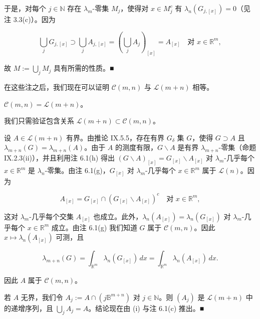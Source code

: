 \begin{remark}
\begin{items}
于是，对每个 $ j \in \mathbb{N} $ 存在 $ \lambda_m $-零集 $ M_j $，使得对 $ x \in M_j^{c} $ 有 $ \lambda_n(G_{j,[x]}) = 0 $（见注 3.3(c)）。因为

\[
\bigcup_j G_{j,[x]} \supset \bigcup_j A_{j,[x]} = \left( \bigcup_j A_j \right)_{[x]} = A_{[x]} \quad \text{对 } x \in \mathbb{R}^m ,
\]

故 $ M := \bigcup_j M_j $ 具有所需的性质。\nobreak\hspace{0.35em}■

\end{items}

在这些注之后，我们现在可以证明 $ \mathcal{C}(m, n) $ 与 $ \mathcal{L}(m+n) $ 相等。

\end{remark}

\begin{proposition}

$ \mathcal{C}(m, n) = \mathcal{L}(m+n) $。

\proofhead
我们只需验证包含关系 $ \mathcal{L}(m+n) \subset \mathcal{C}(m, n) $。

\begin{subitems}
\item

设 $ A \in \mathcal{L}(m+n) $ 有界。由推论 IX.5.5，存在有界 $ G_\delta $ 集 $ G $，使得 $ G \supset A $ 且 $ \lambda_{m+n}(G) = \lambda_{m+n}(A) $。由于 $ A $ 的测度有限，$ G \backslash A $ 是有界 $ \lambda_{m+n} $-零集（命题 IX.2.3(ii)），并且利用注 6.1(h) 得出 $ (G \backslash A)_{[x]} = G_{[x]} \backslash A_{[x]} $ 对 $ \lambda_m $-几乎每个 $ x \in \mathbb{R}^m $ 是 $ \lambda_n $-零集。由注 6.1(g)，$ G_{[x]} $ 对 $ \lambda_m $-几乎每个 $ x \in \mathbb{R}^m $ 属于 $ \mathcal{L}(n) $。因为

\[
A_{[x]} = G_{[x]} \cap (G_{[x]} \backslash A_{[x]})^{c} \quad \text{对 } x \in \mathbb{R}^m ,
\]

这对 $ \lambda_m $-几乎每个交集 $ A_{[x]} $ 也成立。此外，$ \lambda_n(A_{[x]}) = \lambda_n(G_{[x]}) $ 对 $ \lambda_m $-几乎每个 $ x \in \mathbb{R}^m $ 成立。由注 6.1(g) 我们知道 $ G $ 属于 $ \mathcal{C}(m, n) $。因此 $ x \mapsto \lambda_n(A_{[x]}) $ 可测，且

\[
\lambda_{m+n}(G) = \int_{\mathbb{R}^m} \lambda_n(G_{[x]}) \, dx = \int_{\mathbb{R}^m} \lambda_n(A_{[x]}) \, dx .
\]

因此 $ A $ 属于 $ \mathcal{C}(m, n) $。

\item

若 $ A $ 无界，我们令 $ A_j := A \cap (j \mathbb{B}^{m+n}) $ 对 $ j \in \mathbb{N} $。则 $ (A_j) $ 是 $ \mathcal{L}(m+n) $ 中的递增序列，且 $ \bigcup_j A_j = A $。结论现在由 (i) 与注 6.1(c) 推出。\nobreak\hspace{0.35em}■

\end{subitems}

\end{proposition}

